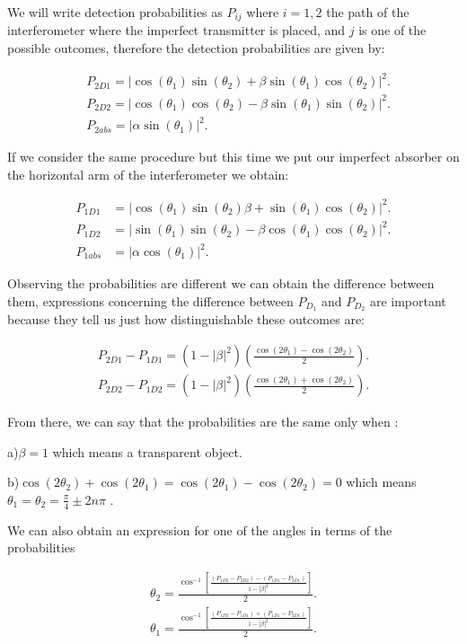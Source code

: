 \documentclass[12pt]{article}
\begin{document}
We will write detection probabilities as $P_{ij}$ where $i=1,2$ the path of the interferometer where the imperfect transmitter is placed, and $j$ is one of the possible outcomes, therefore the detection probabilities are given by:

\begin{align}
& P_{2D1}=|\cos(\theta_{1})\sin(\theta_{2})+\beta \sin(\theta_{1})\cos(\theta_{2})|^2. \\
& P_{2D2}=|\cos(\theta_{1})\cos(\theta_{2})-\beta \sin(\theta_{1})\sin(\theta_{2})|^2. \\
& P_{2abs}=|\alpha \sin(\theta_{1})|^2. 
\end{align}

If we consider the same procedure but this time we put our imperfect absorber on the horizontal arm of the interferometer we obtain:

\begin{align}
P_{1D1}&=|\cos(\theta_{1})\sin(\theta_{2})\beta +\sin(\theta_{1})\cos(\theta_{2})|^2. \\
P_{1D2}&=|\sin(\theta_{1})\sin(\theta_{2})-\beta \cos(\theta_{1})\cos(\theta_{2})|^2.\\
P_{1abs}&=|\alpha \cos(\theta_{1})|^2.
\end{align}



Observing the probabilities are different we can obtain the difference between them, expressions concerning the difference between $P_{D_{1}}$ and $P_{D_{2}}$ are important because they tell us just how distinguishable these outcomes are:


\begin{align}
P_{2D1}-P_{1D1}=(1-|\beta|^2)\left(\frac{\cos(2 \theta_{1})-\cos(2 \theta_{2})}{2}\right). \\
P_{2D2}-P_{1D2}=(1-|\beta|^2)\left(\frac{\cos(2 \theta_{1})+\cos(2 \theta_{2})}{2}\right).
\end{align}

From there, we can say that the probabilities are the same only when :

a)$\beta=1  $ which means a transparent object.

b)$\cos(2 \theta_{2})+\cos(2\theta_{1})=\cos(2 \theta_{1})-\cos(2\theta_{2})=0$   which means   $\theta_{1}=\theta_{2}=\frac{\pi}{4}\pm 2n\pi$
.

We can also obtain an expression for one of the angles in terms of the probabilities


\begin{align}
\theta_{2}=\frac{\cos^{-1}[\frac{(P_{1D2}-P_{2D2})-(P_{1D1}-P_{2D1})}{1-|\beta|^{2}}]}{2}.\\
\theta_{1}=\frac{\cos^{-1}[\frac{(P_{1D2}-P_{1D1})+(P_{1D1}-P_{2D1})}{1-|\beta|^{2}}]}{2}.
\end{align}
\end{document}

